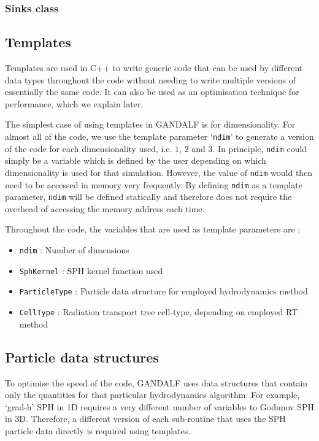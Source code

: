 \documentclass[a4paper]{article}
\newcommand{\var}[1]{\texttt{#1}}
\begin{document}
\subsubsection{Sinks class}



\subsection{Templates}
Templates are used in C++ to write generic code that can be used by different data types throughout the code without needing to write multiple versions of essentially the same code.  It can also be used as an optimisation technique for performance, which we explain later.

The simplest case of using templates in GANDALF is for dimensionality.  For almost all of the code, we use the template parameter `\var{ndim}' to generate a version of the code for each dimensionality used, i.e. $1$, $2$ and $3$.  In principle, \var{ndim} could simply be a variable which is defined by the user depending on which dimensionality is used for that simulation.  However, the value of \var{ndim} would then need to be accessed in memory very frequently.  By defining \var{ndim} as a template parameter, \var{ndim} will be defined statically and therefore does not require the overhead of accessing the memory address each time.

Throughout the code, the variables that are used as template parameters are :
\begin{itemize}
\item \var{ndim} : Number of dimensions
\item \var{SphKernel} : SPH kernel function used
\item \var{ParticleType} : Particle data structure for employed hydrodynamics method
\item \var{CellType} : Radiation transport tree cell-type, depending on employed RT method
\end{itemize}


\subsection{Particle data structures}

To optimise the speed of the code, GANDALF uses data structures that contain only the quantities for that particular hydrodynamics algorithm.  For example, `grad-h' SPH in 1D requires a very different number of variables to Godunov SPH in 3D.  Therefore, a different version of each sub-routine that uses the SPH particle data directly is required using templates.
\end{document}
